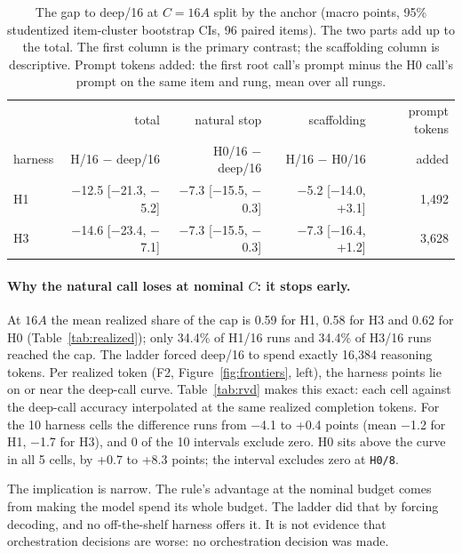 \documentclass[11pt]{article}
\begin{document}
\begin{table}[htbp]
\centering\small
\begin{tabular}{lrrrr}
\toprule
 & total & natural stop & scaffolding & prompt tokens \\
harness & H/16 $-$ deep/16 & H0/16 $-$ deep/16 & H/16 $-$ H0/16 & added \\
\midrule
H1 & $-$12.5 [$-$21.3, $-$5.2]
   & $-$7.3 [$-$15.5, $-$0.3]
   & $-$5.2 [$-$14.0, +3.1]
   & 1,492 \\
H3 & $-$14.6 [$-$23.4, $-$7.1]
   & $-$7.3 [$-$15.5, $-$0.3]
   & $-$7.3 [$-$16.4, +1.2]
   & 3,628 \\
\bottomrule
\end{tabular}
\caption{The gap to deep/16 at $C = 16A$ split by the anchor (macro points, 95\% studentized item-cluster
bootstrap CIs, 96 paired items). The two parts add up to the total. The first column is the primary
contrast; the scaffolding column is descriptive. Prompt tokens added: the first root call's prompt minus the H0
call's prompt on the same item and rung, mean over all rungs.}
\label{tab:decomp}
\end{table}

\paragraph{Why the natural call loses at nominal $C$: it stops early.} At $16A$ the mean realized share of the cap
is 0.59 for H1, 0.58 for H3 and
0.62 for H0 (Table~\ref{tab:realized}); only 34.4\% of
H1/16 runs and 34.4\% of H3/16 runs reached the cap. The ladder forced deep/16 to spend
exactly 16,384 reasoning tokens. Per realized token (F2, Figure~\ref{fig:frontiers}, left), the harness
points lie on or near the deep-call curve. Table~\ref{tab:rvd} makes this exact: each cell against the deep-call
accuracy interpolated at the same realized completion tokens. For the 10 harness
cells the difference runs from $-$4.1 to +0.4
points (mean $-$1.2 for H1, $-$1.7 for
H3), and 0 of the 10 intervals exclude zero. H0 sits above the curve
in all 5 cells, by +0.7 to
+8.3 points; the interval excludes zero at
\texttt{H0/8}.

The implication is narrow. The rule's advantage at the nominal budget comes from making the model spend its whole
budget. The ladder did that by forcing decoding, and no off-the-shelf harness offers it. It is not evidence that
orchestration decisions are worse: no orchestration decision was made.

\begin{table}[htbp]
\centering\small
{}
\caption{Each cell against the deep call at the same realized completion tokens per item (F2, macro,
descriptive). The deep accuracy is interpolated log-linearly in realized tokens between the two adjacent deep
rungs. The difference and its 95\% CI are one paired linear contrast (cell minus the weighted pair of deep
columns) over the items known in all three columns, so it can differ by a point from the difference of the two
printed accuracies. The rung-1 cells realized fewer tokens than deep/1
(1,420) and are left out.}
\label{tab:rvd}
\end{table}
\end{document}
